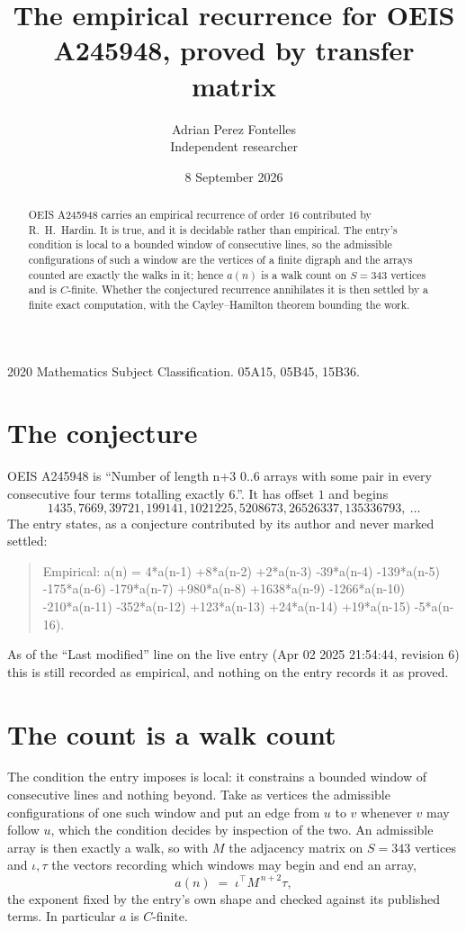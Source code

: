 \documentclass[11pt,a4paper]{article}
\title{The empirical recurrence for OEIS A245948, proved by transfer matrix}
\author{Adrian Perez Fontelles\\ \small Independent researcher}
\date{8 September 2026}
\theoremstyle{plain}
\theoremstyle{definition}
\begin{document}
\maketitle

\begin{abstract}
OEIS A245948 carries an empirical recurrence of order $16$ contributed by R.~H.~Hardin. It is
true, and it is decidable rather than empirical. The entry's condition is local to a bounded window of consecutive lines, so
the admissible configurations of such a window are the vertices of a finite digraph and the
arrays counted are exactly the walks in it; hence $a(n)$ is a walk count on $S=343$ vertices
and is $C$-finite. Whether the conjectured recurrence annihilates it is then settled by a
finite exact computation, with the Cayley--Hamilton theorem bounding the work.
\end{abstract}

\noindent\small 2020 Mathematics Subject Classification. 05A15, 05B45, 15B36.\normalsize

\section{The conjecture}

OEIS A245948 is ``Number of length n+3 0..6 arrays with some pair in every consecutive four terms totalling exactly 6.''. It has offset $1$ and begins
\[
1435, 7669, 39721, 199141, 1021225, 5208673, 26526337, 135336793,\ \dots
\]
The entry states, as a conjecture contributed by its author and never marked settled:
\begin{quote}
Empirical: a(n) = 4*a(n-1) +8*a(n-2) +2*a(n-3) -39*a(n-4) -139*a(n-5) -175*a(n-6) -179*a(n-7) +980*a(n-8) +1638*a(n-9) -1266*a(n-10) -210*a(n-11) -352*a(n-12) +123*a(n-13) +24*a(n-14) +19*a(n-15) -5*a(n-16).
\end{quote}
As of the ``Last modified'' line on the live entry (Apr 02 2025 21:54:44, revision 6) this is still
recorded as empirical, and nothing on the entry records it as proved.

\section{The count is a walk count}

The condition the entry imposes is local: it constrains a bounded window of consecutive lines and nothing beyond. Take as
vertices the admissible configurations of one such window and put an edge from $u$ to $v$
whenever $v$ may follow $u$, which the condition decides by inspection of the two. An
admissible array is then exactly a walk, so with $M$ the adjacency matrix on $S=343$ vertices
and $\iota,\tau$ the vectors recording which windows may begin and end an array,
\[
a(n)\;=\;\iota^{\!\top}M^{\,n+2}\tau ,
\]
the exponent fixed by the entry's own shape and checked against its published terms. In
particular $a$ is $C$-finite.
\end{document}
